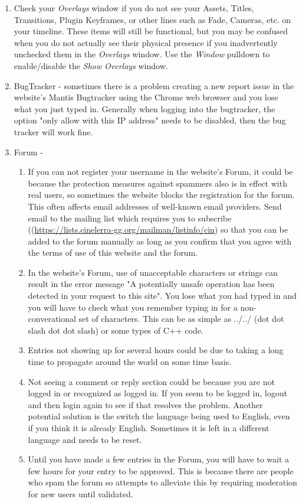 \begin{enumerate}
	\item Check your \textit{Overlays} window if you do not see your Assets, Titles, Transitions, Plugin Keyframes, or other lines such as Fade, Cameras, etc. on your timeline.
These items will still be functional, but you may be confused when you do not actually see their physical presence if you inadvertently unchecked them in the \textit{Overlays} window.  Use the \textit{Window} pulldown to enable/disable the \textit{Show Overlays} window.
	\item BugTracker - sometimes there is a problem creating a new report issue in the website's Mantis Bugtracker
using the Chrome web browser and you lose what you just typed in.  Generally when logging into the bugtracker, the
option "only allow with this IP address" needs to be disabled, then the bug tracker will work fine. 
	\item Forum -

  \begin{enumerate}
 	\item If you can not register your username in the website's Forum, it could be 
because the protection measures against spammers also is in effect with real users, so sometimes the website blocks the registration for the forum. This often affects email addresses of well-known email providers. Send email to the mailing list which requires you to subscribe (({\small \url{https://lists.cinelerra-gg.org/mailman/listinfo/cin}}) so that you can be added to the forum manually as long as
you confirm that you agree with the terms of use of this website and the forum.
	\item In the website's Forum, use of unacceptable characters or strings can result in the error
message "A potentially unsafe operation has been detected in your request to this site".  You lose what
you had typed in and you will have to check what you remember typing in for a non-converational set of 
characters.  This can be as simple as ../../ (dot dot slash dot dot slash) or some types of C++ code.

	\item Entries not showing up for several hours could be due to taking a long time
to propagate around the world on some time basis.
	\item Not seeing a comment or reply section could be because you are not logged in
or recognized as logged in.  If you seem to be logged in, logout and then login again to
see if that resolves the problem.  Another potential solution is the switch the language
being used to English, even if you think it is already English.  Sometimes it is left in
a different language and needs to be reset.
	\item Until you have made a few entries in the Forum, you will have to wait a few
hours for your entry to be approved.  This is because there are people who spam the
forum so attempts to alleviate this by requiring moderation for new users until validated.
  \end{enumerate}

\end{enumerate}

